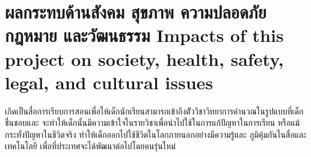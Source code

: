 \section{\ifcpe%
ผลกระทบด้านสังคม สุขภาพ ความปลอดภัย กฎหมาย และวัฒนธรรม
\else%
Impacts of this project on society, health, safety, legal, and cultural issues
\fi}

เกิดเป็นสื่อการเรียบการสอนเพื่อให้เด็กนักเรียนสามารถเข้าถึงตััววิชาวิทยาการคำนวณในรูปแบบที่เด็กชื่นชอบและ
จะทำให้เด็กนั้นมีความเข้าใจในรายวิชาเพื่อนำไปใช้ในการแก้ปัญหาในการเรียน หรือแม้กระทั่งปัญหาในชีวิตจริง ทำให้เด็กออกไปใช้ชีวิตในโลกภายนอกอย่างมีความรู้และ
ภูมิคุ้มกันในสื่อและเทคโนโลยี เพื่อที่ประเทศจะได้พัฒนาต่อไปโดยคนรุ่นใหม่